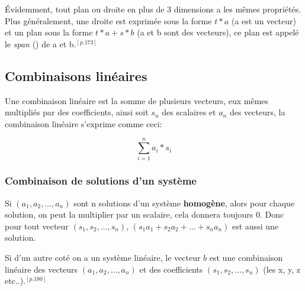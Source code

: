 \documentclass[12pt]{article}
\begin{document}
Évidemment, tout plan ou droite en plus de 3 dimensions a les mêmes propriétés. Plus généralement, une droite est exprimée sous la forme $t*a$ (a est un vecteur) et un plan sous la forme $t*a + s*b$ (a et b sont des vecteurs), ce plan est appelé le {\em span} () de a et b.$^{[p.173]}$ 

\subsection{Combinaisons linéaires}
Une combinaison linéaire est la somme de plusieurs vecteurs, eux mêmes multipliés par des coefficients, ainsi soit $s_n$ des scalaires et $a_n$ des vecteurs, la combinaison linéaire s'exprime comme ceci:

\begin{equation}
  \sum_{i=1}^{n} a_i * s_i
\end{equation}  

\subsubsection{Combinaison de solutions d'un système}

Si $(a_1, a_2, \ldots, a_n)$ sont n solutions d'un système \textbf{homogène}, alors pour chaque solution, on peut la multiplier par un scalaire, cela donnera toujours 0. Donc pour tout vecteur $(s_1, s_2, \ldots, s_n) $, $(s_1a_1 + s_2a_2 + \ldots + s_na_n)$ est aussi une solution.  

Si d'un autre coté on a un système linéaire, le vecteur $b$ est une combinaison linéaire des vecteurs $(a_1, a_2, \ldots, a_n)$ et des coefficients $(s_1, s_2, \ldots, s_n)$ (les x, y, z etc..).$^{[p.180]}$
\end{document}
